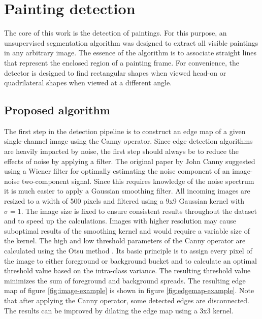 \section{Painting detection}
\label{sec:painting-detection}

The core of this work is the detection of paintings. For this purpose, an unsupervised segmentation algorithm was designed to extract all visible paintings in any arbitrary image. The essence of the algorithm is to associate straight lines that represent the enclosed region of a painting frame. For convenience, the detector is designed to find rectangular shapes when viewed head-on or quadrilateral shapes when viewed at a different angle.

\subsection{Proposed algorithm}
\label{subsec:proposed-algorithm}

The first step in the detection pipeline is to construct an edge map of a given single-channel image using the Canny operator. Since edge detection algorithms are heavily impacted by noise, the first step should always be to reduce the effects of noise by applying a filter. The original paper by John Canny \cite{Canny1986} suggested using a Wiener filter for optimally estimating the noise component of an image-noise two-component signal. Since this requires knowledge of the noise spectrum it is much easier to apply a Gaussian smoothing filter. All incoming images are resized to a width of 500 pixels and filtered using a 9x9 Gaussian kernel with $\sigma = 1$. The image size is fixed to ensure consistent results throughout the dataset and to speed up the calculations.  Images with higher resolution may cause suboptimal results of the smoothing kernel and would require a variable size of the kernel. The high and low threshold parameters of the Canny operator are calculated using the Otsu method \cite{Fang2009} \cite{greensted}. Its basic principle is to assign every pixel of the image to either foreground or background bucket and to calculate an optimal threshold value based on the intra-class variance. The resulting threshold value minimizes the sum of foreground and background spreads. The resulting edge map of figure \ref{fig:image-example} is shown in figure \ref{fig:edgemap-example}. Note that after applying the Canny operator, some detected edges are disconnected. The results can be improved by dilating the edge map using a 3x3 kernel.

